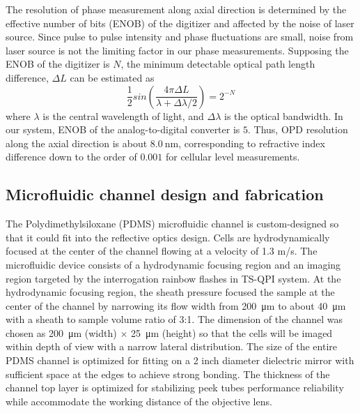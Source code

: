 \documentclass[aps,pra,reprint,groupedaddress]{revtex4-1}
\begin{document}
The resolution of phase measurement along axial direction is determined by the effective number of bits (ENOB) of the digitizer and affected by the noise of laser source. Since pulse to pulse intensity and phase fluctuations are small, noise from laser source is not the limiting factor in our phase measurements. Supposing the ENOB of the digitizer is $N$, the minimum detectable optical path length difference, $\Delta L$ can be estimated as
\begin{equation}
\frac{1}{2}sin\left(\frac{4\pi \Delta L}{\lambda + \Delta \lambda/2}\right)=2^{-N}
\end{equation}
where $\lambda$ is the central wavelength of light, and $\Delta\lambda$ is the optical bandwidth. In our system, ENOB of the analog-to-digital converter is $5$. Thus, OPD resolution along the axial direction is about $\SI{8.0}{\nano\meter}$, corresponding to refractive index difference down to the order of $0.001$ for cellular level measurements.



\subsection{Microfluidic channel design and fabrication}

The Polydimethylsiloxane (PDMS) microfluidic channel is custom-designed so that it could fit into the reflective optics design. Cells are hydrodynamically focused \cite{knight1998hydrodynamic,lee2006hydrodynamic} at the center of the channel flowing at a velocity of 1.3 m/s. The microfluidic device consists of a hydrodynamic focusing region and an imaging region targeted by the interrogation rainbow flashes in TS-QPI system. At the hydrodynamic focusing region, the sheath pressure focused the sample at the center of the channel by narrowing its flow width from \SI{200}{\micro\meter} to about \SI{40}{\micro\meter} with a sheath to sample volume ratio of 3:1. The dimension of the channel was chosen as \SI{200}{\micro\meter} (width) $\times$ \SI{25}{\micro\meter} (height) so that the cells will be imaged within depth of view with a narrow lateral distribution. The size of the entire PDMS channel is optimized for fitting on a 2 inch diameter dielectric mirror with sufficient space at the edges to achieve strong bonding. The thickness of the channel top layer is optimized for stabilizing peek tubes performance reliability while accommodate the working distance of the objective lens. 
\end{document}
